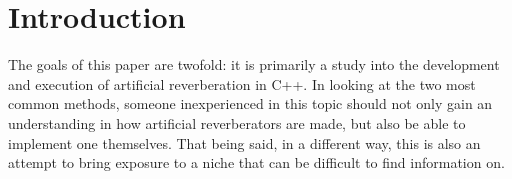 \chapter{Introduction}\label{intro}
\hspace*{-0.155cm}The goals of this paper are twofold: it is primarily a study into the development and execution of artificial reverberation in C++. In looking at the two most common methods, someone inexperienced in this topic should not only gain an understanding in how artificial reverberators are made, but also be able to implement one themselves. That being said, in a different way, this is also an attempt to bring exposure to a niche that can be difficult to find information on.
